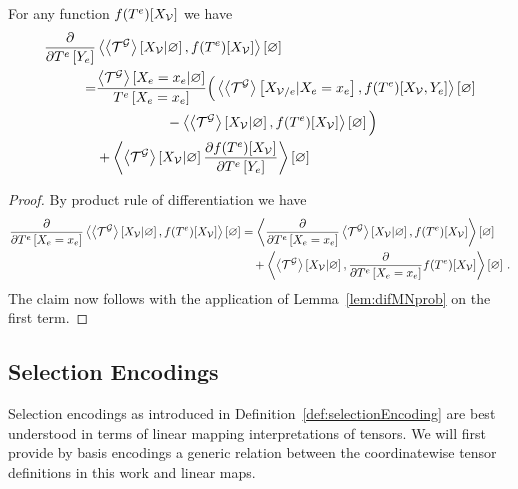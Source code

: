 \begin{lemma}\label{lem:difMNExpectation}
	For any function $f(T^{e})[X_{\mathcal{V}}]$ we have
	\begin{align*}
		 \frac{\partial }{\partial T^{e}\left[Y_{e}\right]} &
		\left\langle \left\langle \mathcal{T}^{\mathcal{G}}\right\rangle \left[ X_{\mathcal{V}} | \varnothing \right],f(T^{e})[X_{\mathcal{V}}]\right\rangle \left[ \varnothing \right] \\
		= & 
		\frac{\left\langle \mathcal{T}^{\mathcal{G}}\right\rangle \left[ X_{e}=x_{e} | \varnothing \right]}{T^{e}\left[X_{e}=x_{e}\right]} 
		\Big( \left\langle \left\langle \mathcal{T}^{\mathcal{G}}\right\rangle \left[ X_{\mathcal{V}/e} | X_{e}=x_{e} \right], f(T^{e})[X_{\mathcal{V}},Y_{e}]\right\rangle \left[ \varnothing \right] \\
		& \quad \quad \quad \quad \quad - \left\langle \left\langle \mathcal{T}^{\mathcal{G}}\right\rangle \left[ X_{\mathcal{V}} | \varnothing \right], f(T^{e})[X_{\mathcal{V}}]\right\rangle \left[ \varnothing \right]
		\Big) \\
		& + \left\langle  \left\langle \mathcal{T}^{\mathcal{G}}\right\rangle \left[ X_{\mathcal{V}} | \varnothing \right]
		\frac{\partial f(T^{e})[X_{\mathcal{V}}]}{\partial T^{e}\left[Y_{e}\right]}
		\right\rangle \left[ \varnothing \right]
	\end{align*}
\end{lemma}
\begin{proof}
	By product rule of differentiation we have
	\begin{align*}
		\frac{\partial }{\partial T^{e}\left[X_{e}=x_{e}\right]} \left\langle \left\langle \mathcal{T}^{\mathcal{G}}\right\rangle \left[ X_{\mathcal{V}} | \varnothing \right],f(T^{e})[X_{\mathcal{V}}]\right\rangle \left[ \varnothing \right] 
		& =  \left\langle \frac{\partial }{\partial T^{e}\left[X_{e}=x_{e}\right]}\left\langle \mathcal{T}^{\mathcal{G}}\right\rangle \left[ X_{\mathcal{V}} | \varnothing \right],f(T^{e})[X_{\mathcal{V}}]\right\rangle \left[ \varnothing \right] \\
		& \quad +  \left\langle \left\langle \mathcal{T}^{\mathcal{G}}\right\rangle \left[ X_{\mathcal{V}} | \varnothing \right],\frac{\partial }{\partial T^{e}\left[X_{e}=x_{e}\right]}f(T^{e})[X_{\mathcal{V}}]\right\rangle \left[ \varnothing \right]  \, . 
	\end{align*}
	The claim now follows with the application of Lemma~\ref{lem:difMNprob} on the first term.
\end{proof}






\subsection{Selection Encodings}

Selection encodings as introduced in Definition~\ref{def:selectionEncoding} are best understood in terms of linear mapping interpretations of tensors.
We will first provide by basis encodings a generic relation between the coordinatewise tensor definitions in this work and linear maps.

